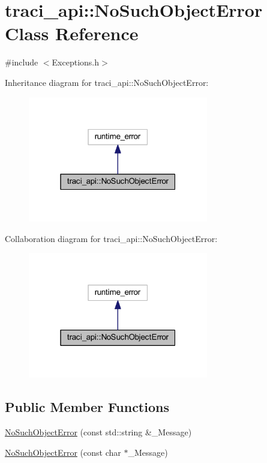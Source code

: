 \hypertarget{classtraci__api_1_1_no_such_object_error}{}\section{traci\+\_\+api\+:\+:No\+Such\+Object\+Error Class Reference}
\label{classtraci__api_1_1_no_such_object_error}


{\ttfamily \#include $<$Exceptions.\+h$>$}



Inheritance diagram for traci\+\_\+api\+:\+:No\+Such\+Object\+Error\+:\nopagebreak
\begin{figure}[H]
\begin{center}
\leavevmode
\includegraphics[width=223pt]{classtraci__api_1_1_no_such_object_error__inherit__graph}
\end{center}
\end{figure}


Collaboration diagram for traci\+\_\+api\+:\+:No\+Such\+Object\+Error\+:\nopagebreak
\begin{figure}[H]
\begin{center}
\leavevmode
\includegraphics[width=223pt]{classtraci__api_1_1_no_such_object_error__coll__graph}
\end{center}
\end{figure}
\subsection*{Public Member Functions}
\begin{DoxyCompactItemize}
\item 
\hyperlink{classtraci__api_1_1_no_such_object_error_aebe9140c2931a0e35c5b51bbc9c511ef}{No\+Such\+Object\+Error} (const std\+::string \&\+\_\+\+Message)
\item 
\hyperlink{classtraci__api_1_1_no_such_object_error_af616a893c0094adf1d46bd3fa0664c62}{No\+Such\+Object\+Error} (const char $\ast$\+\_\+\+Message)
\end{DoxyCompactItemize}


